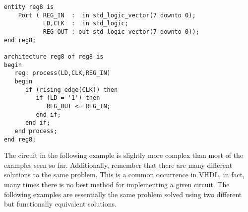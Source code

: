 \begin{lstlisting}[label=ex23_code, caption=Solution to EXAMPLE 23.]
entity reg8 is
    Port ( REG_IN  :  in std_logic_vector(7 downto 0);
           LD,CLK  :  in std_logic;
           REG_OUT : out std_logic_vector(7 downto 0));
end reg8;

architecture reg8 of reg8 is
begin
   reg: process(LD,CLK,REG_IN)
   begin
      if (rising_edge(CLK)) then 
         if (LD = '1') then 
            REG_OUT <= REG_IN; 
         end if;
      end if;
   end process; 
end reg8;
\end{lstlisting}

The circuit in the following example is slightly more complex than most of the examples seen so far. Additionally, remember that there are many different solutions to the same problem. This is a common occurrence in VHDL, in fact, many times there is no best method for implementing a given circuit. The following examples are essentially the same problem solved using two different but functionally equivalent solutions.

